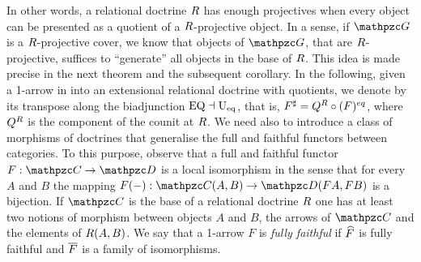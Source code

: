 In other words, a relational doctrine $R$ has enough projectives when every object can be presented as a quotient of a $R$-projective object. 
In a sense, if $\ct{G}$ is a $R$-projective cover, we know that objects of $\ct{G}$, that are $R$-projective, suffices to ``generate'' all objects in the base of $R$.
This idea is made precise in the next theorem and the subsequent corollary. 
In the following, 
given a 1-arrow  in \RDtn into an extensional relational doctrine with quotients, we denote by  its transpose along the biadjunction $\mathrm{EQ}\dashv\mathrm{U_{eq}}$, that is, 
$F^\sharp = Q^R\circ(F)^{eq}$, where $Q^R$ is the component of the counit at $R$. 
% 
We need also to introduce a class of morphisms of doctrines that generalise the full and faithful functors between categories. To this purpose, observe that a full and faithful functor $F:\CC\to\ct{D}$ is a local isomorphism in the sense that for every $A$ and $B$ the mapping $\fun{F(-)}{\CC(A,B)}{\ct{D}(FA,FB)}$ is a bijection. If $\CC$ is the base of a relational doctrine $R$ one has at least two notions of morphism between objects $A$ and $B$, the arrows of $\CC$ and the elements of $R(A,B)$. We say that a 1-arrow $F$ is \emph{fully faithful} if $\widehat{F}$ is fully faithful and $\overline{F}$ is a family of isomorphisms.

